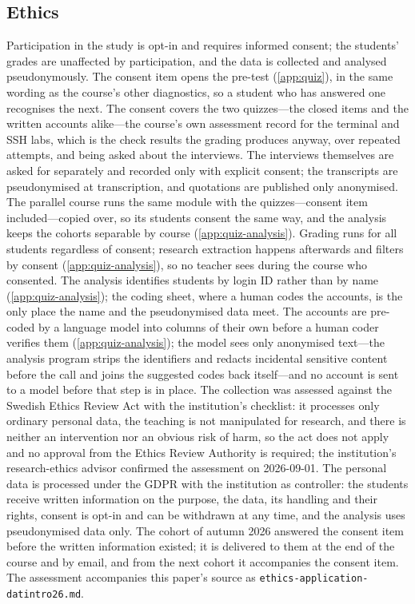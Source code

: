 \subsection{Ethics}
\label{sec:ethics}

Participation in the study is opt-in and requires informed consent; the
students' grades are unaffected by participation, and the data is
collected and analysed pseudonymously.
The consent item opens the pre-test (\cref{app:quiz}), in the same
wording as the course's other diagnostics, so a student who has answered
one recognises the next.
The consent covers the two quizzes---the closed items and the written
accounts alike---the course's own assessment record for the terminal and
SSH labs, which is the check results the grading produces anyway, over
repeated attempts, and being asked about the interviews.
The interviews themselves are asked for separately and recorded only
with explicit consent; the transcripts are pseudonymised at
transcription, and quotations are published only anonymised.
The parallel course runs the same module with the quizzes---consent item
included---copied over, so its students consent the same way, and the
analysis keeps the cohorts separable by course (\cref{app:quiz-analysis}).
Grading runs for all students regardless of consent; research extraction
happens afterwards and filters by consent (\cref{app:quiz-analysis}), so
no teacher sees during the course who consented.
The analysis identifies students by login ID rather than by name
(\cref{app:quiz-analysis}); the coding sheet, where a human codes the
accounts, is the only place the name and the pseudonymised data meet.
The accounts are pre-coded by a language model into columns of their
own before a human coder verifies them (\cref{app:quiz-analysis}); the
model sees only anonymised text---the analysis program strips the
identifiers and redacts incidental sensitive content before the call and
joins the suggested codes back itself---and no account is sent to a
model before that step is in place.
The collection was assessed against the Swedish Ethics Review Act
\autocite{Etikprovningslagen} with the institution's checklist: it
processes only ordinary personal data, the teaching is not manipulated
for research, and there is neither an intervention nor an obvious risk
of harm, so the act does not apply and no approval from the Ethics
Review Authority is required; the institution's research-ethics advisor
confirmed the assessment on 2026-09-01.
The personal data is processed under the GDPR with the institution as
controller: the students receive written information on the purpose,
the data, its handling and their rights, consent is opt-in and can be
withdrawn at any time, and the analysis uses pseudonymised data only.
The cohort of autumn 2026 answered the consent item before the written
information existed; it is delivered to them at the end of the course
and by email, and from the next cohort it accompanies the consent item.
The assessment accompanies this paper's source as
\texttt{ethics-application-datintro26.md}.
